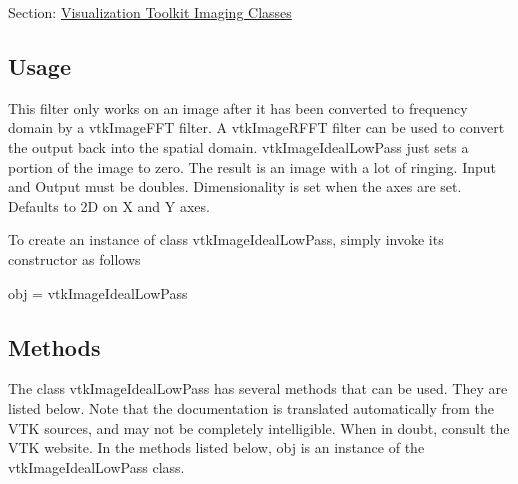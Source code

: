 Section\-: \hyperlink{sec_vtkimaging}{Visualization Toolkit Imaging Classes} \hypertarget{vtkwidgets_vtkxyplotwidget_Usage}{}\subsection{Usage}\label{vtkwidgets_vtkxyplotwidget_Usage}
This filter only works on an image after it has been converted to frequency domain by a vtk\-Image\-F\-F\-T filter. A vtk\-Image\-R\-F\-F\-T filter can be used to convert the output back into the spatial domain. vtk\-Image\-Ideal\-Low\-Pass just sets a portion of the image to zero. The result is an image with a lot of ringing. Input and Output must be doubles. Dimensionality is set when the axes are set. Defaults to 2\-D on X and Y axes.

To create an instance of class vtk\-Image\-Ideal\-Low\-Pass, simply invoke its constructor as follows \begin{DoxyVerb}  obj = vtkImageIdealLowPass
\end{DoxyVerb}
 \hypertarget{vtkwidgets_vtkxyplotwidget_Methods}{}\subsection{Methods}\label{vtkwidgets_vtkxyplotwidget_Methods}
The class vtk\-Image\-Ideal\-Low\-Pass has several methods that can be used. They are listed below. Note that the documentation is translated automatically from the V\-T\-K sources, and may not be completely intelligible. When in doubt, consult the V\-T\-K website. In the methods listed below, {\ttfamily obj} is an instance of the vtk\-Image\-Ideal\-Low\-Pass class. 
